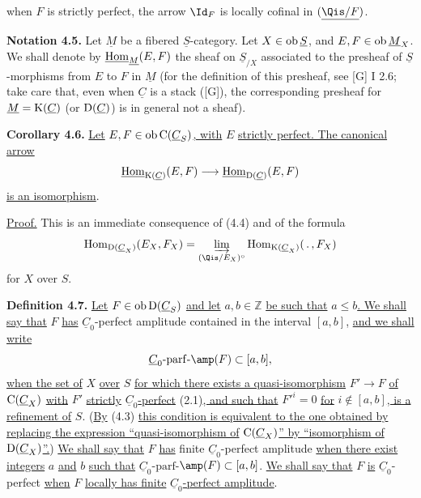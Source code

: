 %
when \(F\) is strictly perfect, the arrow \(\Id_F\) is locally cofinal in \((\underline{\Qis/F})\).

\textbf{Notation 4.5.} Let \(\underline{M}\) be a fibered \(\underline{S}\)-category. Let \(X\in\operatorname{ob} \underline{S}\), and \(E,F\in\operatorname{ob}\underline{M}_X\). We shall denote by \(\underline{\operatorname{Hom}}_{\underline{M}}(E,F)\) the sheaf on \(\underline{S}_{/X}\) associated to the presheaf of \(\underline{S}\)-morphisms from \(E\) to \(F\) in \(\underline{M}\) (for the definition of this presheaf, see [G] I 2.6; take care that, even when \(\underline{C}\) is a stack ([G]), the corresponding presheaf for \(\underline{M}=\mathrm K(\underline{C})\) (or \(\mathrm D(\underline{C})\)) is in general not a sheaf).

\textbf{Corollary 4.6.} \uline{Let} \(E,F\in\operatorname{ob}\mathrm C(\underline{C}_S)\)\uline{, with} \(E\) \uline{strictly perfect. The canonical arrow}
\[
  \underline{\operatorname{Hom}}_{\mathrm K(\underline{C})}(E,F)
  \longrightarrow
  \underline{\operatorname{Hom}}_{\mathrm D(\underline{C})}(E,F)
\]
\uline{is an isomorphism}.

\uline{Proof.} This is an immediate consequence of (4.4) and of the formula
\[
  \Hom_{\Dpx(\underline{C}_X)}(E_X,F_X)
  = \varinjlim_{(\Qis/E_X)^\circ}\Hom_{\Kpx(\underline{C}_X)}(\,.\,,F_X)
\]
for \(X\) over \(S\).

\textbf{Definition 4.7.} \uline{Let} \(F\in\operatorname{ob}\mathrm D(\underline{C}_S)\) \uline{and let} \(a,b\in\mathbb Z\) \uline{be such that} \(a\leq b\)\uline{. We shall say that} \(F\) \uline{has} \(\underline{C}_0\)-perfect amplitude contained in the interval \([a,b]\), \uline{and we shall write}
\[
  \underline{C}_0\text{-}\mathrm{parf}\text{-}\amp(F)\subset[a,b],
\]
\uline{when the set of} \(X\) \uline{over} \(S\) \uline{for which there exists a quasi-isomorphism}
%
\(F'\to F\) \uline{of} \(\mathrm C(\underline{C}_X)\) \uline{with} \(F'\) \uline{strictly} \(\underline{C}_0\)\uline{-perfect} (2.1)\uline{, and such that} \(F'^i=0\) \uline{for} \(i\notin[a,b]\)\uline{, is a refinement of} \(S\). (\uline{By} (4.3) \uline{this condition is equivalent to the one obtained by replacing the expression ``quasi-isomorphism of} \(\mathrm C(\underline{C}_X)\)\uline{'' by ``isomorphism of} \(\mathrm D(\underline{C}_X)\)\uline{''.}) \uline{We shall say that} \(F\) \uline{has} finite \(\underline{C}_0\)-perfect amplitude \uline{when there exist integers} \(a\) \uline{and} \(b\) \uline{such that} \(\underline{C}_0\)-\(\mathrm{parf}\)-\(\amp(F)\subset[a,b]\). \uline{We shall say that} \(F\) \uline{is} \(\underline{C}_0\)-perfect \uline{when} \(F\) \uline{locally has finite} \(\underline{C}_0\)\uline{-perfect amplitude}.

